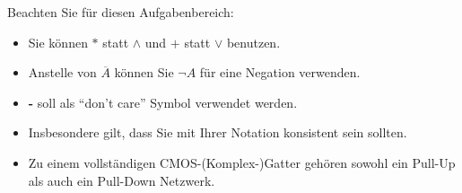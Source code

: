 Beachten Sie für diesen Aufgabenbereich:
\begin{itemize}
	\item Sie können $*$ statt $\land$ und $+$ statt $\lor$ benutzen.
	\item Anstelle von $\overline{A}$ können Sie $\neg A$ für eine Negation verwenden.
	\item \textbf{-} soll als ``don't care'' Symbol verwendet werden.
	\item Insbesondere gilt, dass Sie mit Ihrer Notation konsistent sein sollten.
	\item Zu einem vollständigen CMOS-(Komplex-)Gatter gehören sowohl ein Pull-Up als auch ein Pull-Down Netzwerk.
\end{itemize}